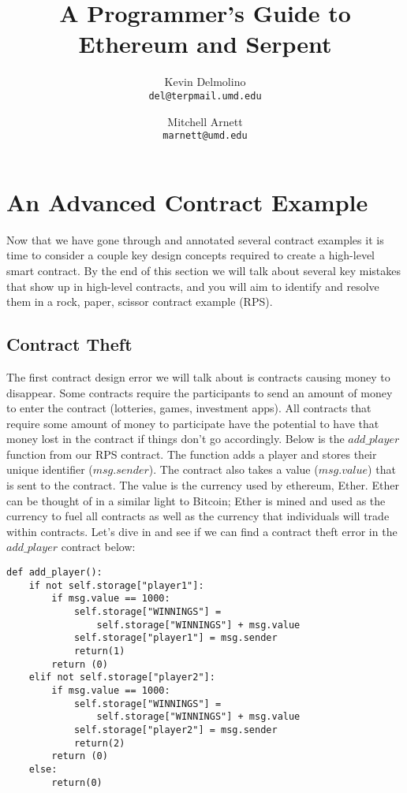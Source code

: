 \documentclass[12pt]{article}
\begin{document}
\title{A Programmer's Guide to Ethereum and Serpent}

\author{
  Kevin Delmolino\\
  \texttt{del@terpmail.umd.edu}
  \and
  Mitchell Arnett\\
  \texttt{marnett@umd.edu}
}

\maketitle

\setcounter{tocdepth}{5}
\tableofcontents

\section{An Advanced Contract Example}
Now that we have gone through and annotated several contract examples it is time to consider a couple key design concepts required to create a high-level smart contract. By the end of this section we will talk about several key mistakes that show up in high-level contracts, and you will aim to identify and resolve them in a rock, paper, scissor contract example (RPS).

\subsection{Contract Theft}
The first contract design error we will talk about is contracts causing money to disappear. Some contracts require the participants to send an amount of money to enter the contract (lotteries, games, investment apps). All contracts that require some amount of money to participate have the potential to have that money lost in the contract if things don't go accordingly. Below is the $add\_player$ function from our RPS contract. The function adds a player and stores their unique identifier ($msg.sender$). The contract also takes a value ($msg.value$) that is sent to the contract. The value is the currency used by ethereum, Ether. Ether can be thought of in a similar light to Bitcoin; Ether is mined and used as the currency to fuel all contracts as well as the currency that individuals will trade within contracts. Let's dive in and see if we can find a contract theft error in the $add\_player$ contract below: 

\begin{lstlisting}[frame=single]
def add_player():
	if not self.storage["player1"]:
		if msg.value == 1000:
			self.storage["WINNINGS"] = 
				self.storage["WINNINGS"] + msg.value
			self.storage["player1"] = msg.sender
			return(1)
		return (0)
	elif not self.storage["player2"]:
		if msg.value == 1000:
			self.storage["WINNINGS"] = 
				self.storage["WINNINGS"] + msg.value
			self.storage["player2"] = msg.sender
			return(2)
		return (0)
	else:
		return(0)
\end{lstlisting}
\end{document}
